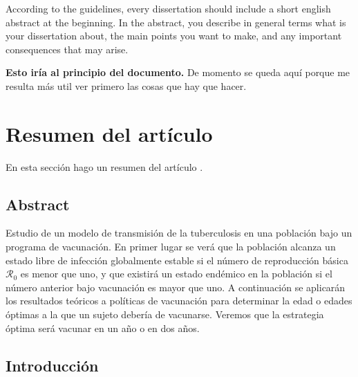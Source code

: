 \documentclass[
]{book}
\begin{document}
According to the guidelines, every dissertation should include a short english abstract at the beginning. In the abstract, you describe in general terms what is your dissertation about, the main points you want to make, and any important consequences that may arise.

\textbf{Esto iría al principio del documento.} De momento se queda aquí porque me resulta más util ver primero las cosas que hay que hacer.

\hypertarget{resumen-del-artuxedculo}{%
\chapter{Resumen del artículo}\label{resumen-del-artuxedculo}}

En esta sección hago un resumen del artículo \citet{castillo-chavez_global_1998}.

\hypertarget{abstract}{%
\section*{Abstract}\label{abstract}}

Estudio de un modelo de transmisión de la tuberculosis en una población bajo un programa de vacunación. En primer lugar se verá que la población alcanza un estado libre de infección globalmente estable si el número de reproducción básica \(\mathscr{R_0}\) es menor que uno, y que existirá un estado endémico en la población si el número anterior bajo vacunación es mayor que uno. A continuación se aplicarán los resultados teóricos a políticas de vacunación para determinar la edad o edades óptimas a la que un sujeto debería de vacunarse. Veremos que la estrategia óptima será vacunar en un año o en dos años.

\hypertarget{introducciuxf3n}{%
\section{Introducción}\label{introducciuxf3n}}
\end{document}
